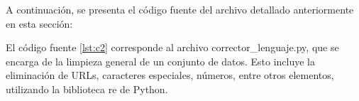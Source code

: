 A continuación, se presenta el código fuente del  archivo detallado anteriormente en esta sección:

El código fuente \ref{lst:c2} corresponde al archivo corrector\_lenguaje.py, que se encarga de la limpieza general de un conjunto de datos. Esto incluye la eliminación de URLs, caracteres especiales, números, entre otros elementos, utilizando la biblioteca re de Python.




